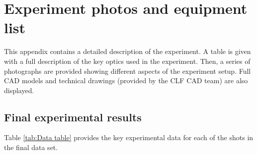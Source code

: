 

\chapter{Experiment photos and equipment list} \label{app:experimentphotos}

\minitoc

This appendix contains a detailed description of the experiment. A table is given with a full description of the key optics used in the experiment. Then, a series of photographs are provided showing different aspects of the experiment setup. Full CAD models and technical drawings (provided by the CLF CAD team) are also displayed.

\section{Final experimental results}

Table \ref{tab:Data table} provides the key experimental data for each of the shots in the final data set.

